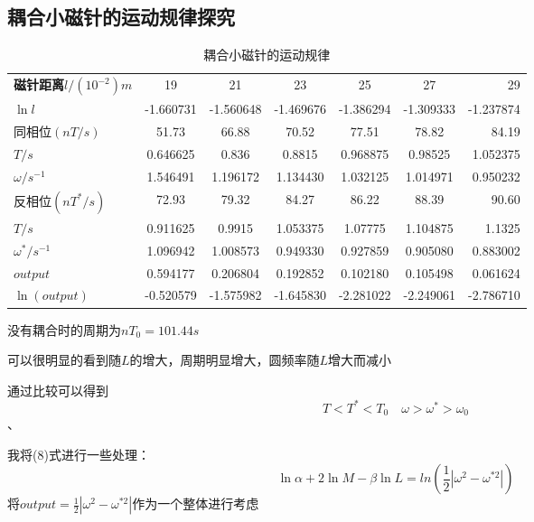 \documentclass{article}
\begin{document}
\subsection{耦合小磁针的运动规律探究}
\begin{table}[!hbtp]
    \begin{center}
    \caption{耦合小磁针的运动规律}
    \begin{tabular}{l|c|c|c|c|c|r}
        \textbf{磁针距离$l/(10^{-2})m$} & 19 & 21 & 23 & 25 & 27 & 29 \\
        $\ln l$ & -1.660731 & -1.560648 & -1.469676 & -1.386294 & -1.309333 & -1.237874 \\
        \hline
        同相位$(nT/s)$ & 51.73 & 66.88 & 70.52 & 77.51 & 78.82 & 84.19 \\
        $T/s$ & 0.646625 & 0.836 & 0.8815 & 0.968875 & 0.98525 & 1.052375 \\
        $\omega/s^{-1}$ & 1.546491 & 1.196172 & 1.134430 & 1.032125 & 1.014971 & 0.950232 \\
        \hline
        反相位$(nT^*/s)$ & 72.93 & 79.32 & 84.27 & 86.22 & 88.39 & 90.60 \\
        $T/s$ & 0.911625 & 0.9915 & 1.053375 & 1.07775 & 1.104875 & 1.1325 \\
        $\omega^*/s^{-1}$ & 1.096942 & 1.008573 & 0.949330 & 0.927859 & 0.905080 & 0.883002 \\
        \hline
        $output$ & 0.594177 & 0.206804 & 0.192852 & 0.102180 & 0.105498 & 0.061624 \\
        $\ln(output)$ & -0.520579 & -1.575982 & -1.645830 & -2.281022 & -2.249061 & -2.786710 \\
    \end{tabular}
    \end{center}
\end{table}
没有耦合时的周期为$nT_0=101.44s$

可以很明显的看到随$L$的增大，周期明显增大，圆频率随$L$增大而减小

通过比较可以得到$$T<T^*<T_0\quad \omega >\omega ^*>\omega _0$$、

我将(8)式进行一些处理：
\begin{equation}
    \ln \alpha+2\ln M-\beta\ln L=ln(\frac{1}{2}\left|\omega^2-\omega^{*2}\right|)
\end{equation}
将$output=\frac{1}{2}\left|\omega^2-\omega^{*2}\right|$作为一个整体进行考虑

\end{document}
